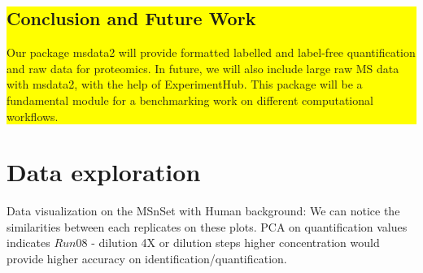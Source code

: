 \documentclass{article}
\newcommand{\hcode}[2][lgray]{{\ttfamily\color{vdgray}\colorbox{#1}{#2}}}
\begin{document}
\begin{multicols}{2}
\vspace{.4cm}
\noindent
\colorbox{yellow}{
  \begin{minipage}[t]{0.965\linewidth}
    \vspace{.15cm}
    \section*{\huge Conclusion and Future Work}
    \large Our package \hcode{msdata2} will provide formatted labelled
    and label-free quantification and raw data for proteomics.  In
    future, we will also include large raw MS data with
    \hcode{msdata2}, with the help of ExperimentHub. This package will
    be a fundamental module for a benchmarking work on different
    computational workflows.

  \end{minipage}
}


\noindent
\begin{minipage}[h]{1\linewidth}
  \vspace{1cm}

  \section*{Data exploration}
  \large

  Data visualization on the \hcode{MSnSet} with Human background: We can
  notice the similarities between each replicates on these plots. PCA
  on quantification values indicates $Run08$ - dilution 4X or dilution
  steps higher concentration would provide higher accuracy on
  identification/quantification.

\end{minipage}


\end{multicols}
\end{document}
